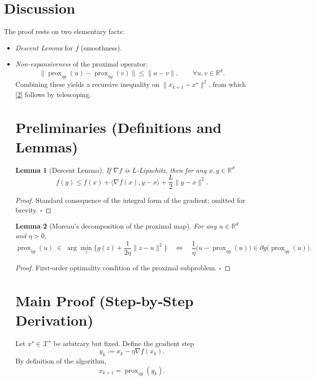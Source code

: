 \documentclass{article}
\newtheorem{lemma}{Lemma}
\newcommand{\prox}{\operatorname{prox}}
\newcommand{\R}{\mathbb{R}}
\begin{document}
\section*{Discussion}
The proof rests on two elementary facts:
\begin{itemize}[noitemsep]
\item \emph{Descent Lemma} for $f$ (smoothness).
\item \emph{Non‑expansiveness} of the proximal operator:
\[
\|\prox_{\eta g}(u)-\prox_{\eta g}(v)\|\le\|u-v\|,\qquad\forall u,v\in\R^{d}.
\tag{3}
\]
Combining these yields a recursive inequality on $\|x_{k+1}-x^\star\|^{2}$, from which \eqref{2} follows by telescoping.

\newpage
\section*{Preliminaries (Definitions and Lemmas)}
\begin{lemma}[Descent Lemma]\label{lem:descent}
If $\nabla f$ is $L$‑Lipschitz, then for any $x,y\in\R^{d}$
\[
f(y)\le f(x)+\langle\nabla f(x),y-x\rangle+\frac{L}{2}\|y-x\|^{2}.
\tag{4}
\]
\end{lemma}
\begin{proof}
Standard consequence of the integral form of the gradient; omitted for brevity. \hfill $\square$
\end{proof}
\begin{lemma}[Moreau’s decomposition of the proximal map]\label{lem:prox_opt}
For any $u\in\R^{d}$ and $\eta>0$,
\[
\prox_{\eta g}(u)\;\in\;\arg\min_{z}\Big\{ g(z)+\frac{1}{2\eta}\|z-u\|^{2}\Big\}
\quad\Longleftrightarrow\quad
\frac{1}{\eta}\bigl(u-\prox_{\eta g}(u)\bigr)\in\partial g\bigl(\prox_{\eta g}(u)\bigr).
\tag{5}
\]
\end{lemma}
\begin{proof}
First‑order optimality condition of the proximal subproblem. \hfill $\square$
\end{proof}

\section*{Main Proof (Step‑by‑Step Derivation)}
Let $x^\star\in\mathcal{X}^\star$ be arbitrary but fixed. Define the gradient step
\[
y_k:=x_k-\eta\nabla f(x_k).
\tag{6}
\]
By definition of the algorithm,
\[
x_{k+1}= \prox_{\eta g}(y_k).
\tag{7}
\]

\end{itemize}
\end{document}
